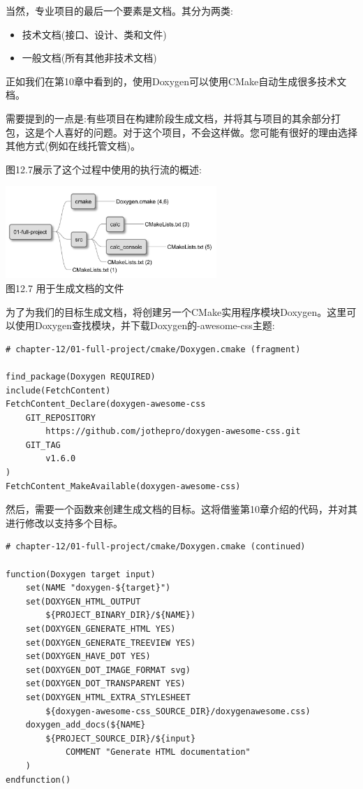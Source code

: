 
当然，专业项目的最后一个要素是文档。其分为两类:

\begin{itemize}
\item 
技术文档(接口、设计、类和文件)

\item 
一般文档(所有其他非技术文档)
\end{itemize}

正如我们在第10章中看到的，使用Doxygen可以使用CMake自动生成很多技术文档。


需要提到的一点是:有些项目在构建阶段生成文档，并将其与项目的其余部分打包，这是个人喜好的问题。对于这个项目，不会这样做。您可能有很好的理由选择其他方式(例如在线托管文档)。

图12.7展示了这个过程中使用的执行流的概述:

\begin{center}
\includegraphics[width=0.6\textwidth]{content/3/chapter12/images/7.jpg}\\
图12.7 用于生成文档的文件
\end{center}

为了为我们的目标生成文档，将创建另一个CMake实用程序模块Doxygen。这里可以使用Doxygen查找模块，并下载Doxygen的-awesome-css主题:

\begin{lstlisting}[style=styleCMake]
# chapter-12/01-full-project/cmake/Doxygen.cmake (fragment)

find_package(Doxygen REQUIRED)
include(FetchContent)
FetchContent_Declare(doxygen-awesome-css
	GIT_REPOSITORY
		https://github.com/jothepro/doxygen-awesome-css.git
	GIT_TAG
		v1.6.0
)
FetchContent_MakeAvailable(doxygen-awesome-css)
\end{lstlisting}

然后，需要一个函数来创建生成文档的目标。这将借鉴第10章介绍的代码，并对其进行修改以支持多个目标。

\begin{lstlisting}[style=styleCMake]
# chapter-12/01-full-project/cmake/Doxygen.cmake (continued)

function(Doxygen target input)
	set(NAME "doxygen-${target}")
	set(DOXYGEN_HTML_OUTPUT
		${PROJECT_BINARY_DIR}/${NAME})
	set(DOXYGEN_GENERATE_HTML YES)
	set(DOXYGEN_GENERATE_TREEVIEW YES)
	set(DOXYGEN_HAVE_DOT YES)
	set(DOXYGEN_DOT_IMAGE_FORMAT svg)
	set(DOXYGEN_DOT_TRANSPARENT YES)
	set(DOXYGEN_HTML_EXTRA_STYLESHEET
		${doxygen-awesome-css_SOURCE_DIR}/doxygenawesome.css)
	doxygen_add_docs(${NAME}
		${PROJECT_SOURCE_DIR}/${input}
			COMMENT "Generate HTML documentation"
	)
endfunction()
\end{lstlisting}

